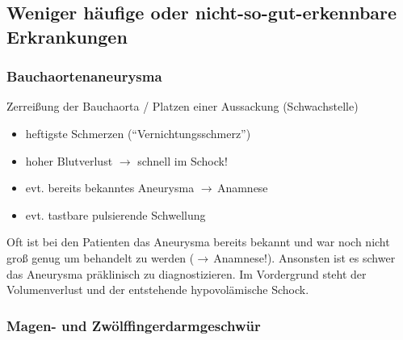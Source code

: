 \subsection{Weniger häufige oder nicht-so-gut-erkennbare Erkrankungen}



\subsubsection{Bauchaortenaneurysma}

Zerrei{\ss}ung der Bauchaorta / Platzen  einer Aussackung
(Schwachstelle)

\gMarried
{}
{

\begin{itemize}
    \item heftigste Schmerzen
("`Vernichtungsschmerz"')
\item     hoher Blutverlust ${\rightarrow}$ schnell im 
Schock!
\item evt. bereits bekanntes Aneurysma
${\rightarrow}$\,Anamnese
\item evt. tastbare pulsierende Schwellung
\end{itemize}
}

Oft ist bei den Patienten das Aneurysma bereits bekannt und
war noch nicht groß genug um behandelt zu werden
(${\rightarrow}$\,Anamnese!). Ansonsten ist es schwer das
Aneurysma präklinisch zu diagnostizieren. Im Vordergrund
steht der Volumenverlust und der entstehende hypovolämische
Schock. 



\subsubsection{Magen- und Zwölffingerdarmgeschwür}



